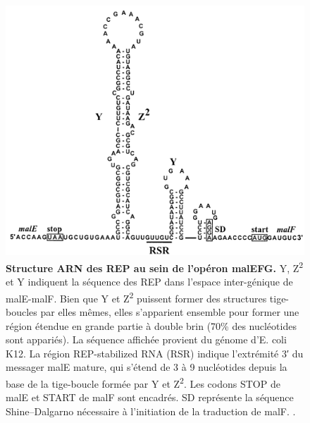 \documentclass[12pt,a4paper]{report}
\begin{document}
\begin{onehalfspace}
\begin{figure}[ht]
\centerline{\includegraphics[scale=0.5]{figures/malEF_rep.png}}
\caption{\textbf{Structure ARN des REP au sein de l’opéron malEFG.} Y, Z\textsuperscript{2} et Y indiquent la séquence des REP dans l'espace inter-génique de malE-malF. Bien que Y et Z\textsuperscript{2} puissent former des structures tige-boucles par elles mêmes, elles s'apparient ensemble pour former une région étendue en grande partie à double brin (70\% des nucléotides sont appariés). La séquence affichée provient du génome d'E. coli K12. La région REP-stabilized RNA (RSR) indique l'extrémité 3′ du messager malE mature, qui s'étend de 3 à 9 nucléotides depuis la base de la tige-boucle formée par Y et Z\textsuperscript{2}. Les codons STOP de  malE et START de malF sont encadrés. SD représente la séquence Shine–Dalgarno nécessaire à l'initiation de la traduction de malF. \citep{Khemici2004}.}
\label{fig:malEF_rep} 
\end{figure}



\end{onehalfspace}
\end{document}
